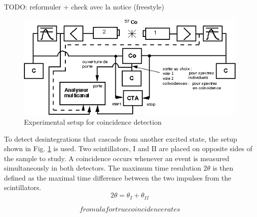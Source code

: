 TODO: reformuler + check avec la notice (freestyle)

\begin{figure}[h]
    \centering
    \includegraphics[width=\textwidth]{figures/coincidences.png}
    \caption{Experimental setup for coincidence detection \cite{notice_VI}}
    \label{fig:setup_coincidences}
\end{figure}

To detect desintegrations that cascade from another excited state, the setup shown in Fig. \ref{fig:setup_coincidences} is used. Two scintillators, I and II are placed on opposite sides of the sample to study. A coincidence occurs whenever an event is measured simultaneously in both detectors. The maximum time resulution \(2 \theta\) is then defined as the maximal time difference between the two impulses from the scintillators.
\begin{equation}
    2 \theta = \theta_I + \theta_{II}
\end{equation}

\begin{equation}
    fromula for true coincidence rates
\end{equation}